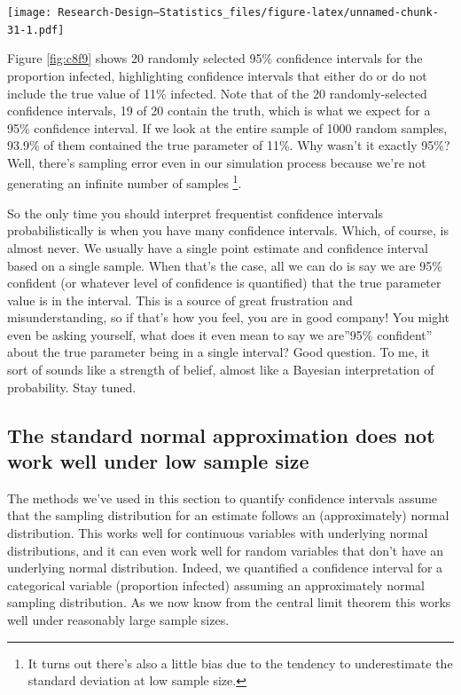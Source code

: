 \documentclass[
]{book}
\begin{document}
\texttt{[image: Research-Design---Statistics\_files/figure-latex/unnamed-chunk-31-1.pdf]}

Figure \ref{fig:c8f9} shows 20 randomly selected 95\% confidence intervals for the proportion infected, highlighting confidence intervals that either do or do not include the true value of 11\% infected. Note that of the 20 randomly-selected confidence intervals, 19 of 20 contain the truth, which is what we expect for a 95\% confidence interval. If we look at the entire sample of 1000 random samples, 93.9\% of them contained the true parameter of 11\%. Why wasn't it exactly 95\%? Well, there's sampling error even in our simulation process because we're not generating an infinite number of samples \footnote{It turns out there's also a little bias due to the tendency to underestimate the standard deviation at low sample size.}.

So the only time you should interpret frequentist confidence intervals probabilistically is when you have many confidence intervals. Which, of course, is almost never. We usually have a single point estimate and confidence interval based on a single sample. When that's the case, all we can do is say we are 95\% confident (or whatever level of confidence is quantified) that the true parameter value is in the interval. This is a source of great frustration and misunderstanding, so if that's how you feel, you are in good company! You might even be asking yourself, what does it even mean to say we are''95\% confident'' about the true parameter being in a single interval? Good question. To me, it sort of sounds like a strength of belief, almost like a Bayesian interpretation of probability. Stay tuned.

\subsection{The standard normal approximation does not work well under low sample size}\label{the-standard-normal-approximation-does-not-work-well-under-low-sample-size}

The methods we've used in this section to quantify confidence intervals assume that the sampling distribution for an estimate follows an (approximately) normal distribution. This works well for continuous variables with underlying normal distributions, and it can even work well for random variables that don't have an underlying normal distribution. Indeed, we quantified a confidence interval for a categorical variable (proportion infected) assuming an approximately normal sampling distribution. As we now know from the central limit theorem this works well under reasonably large sample sizes.
\end{document}
